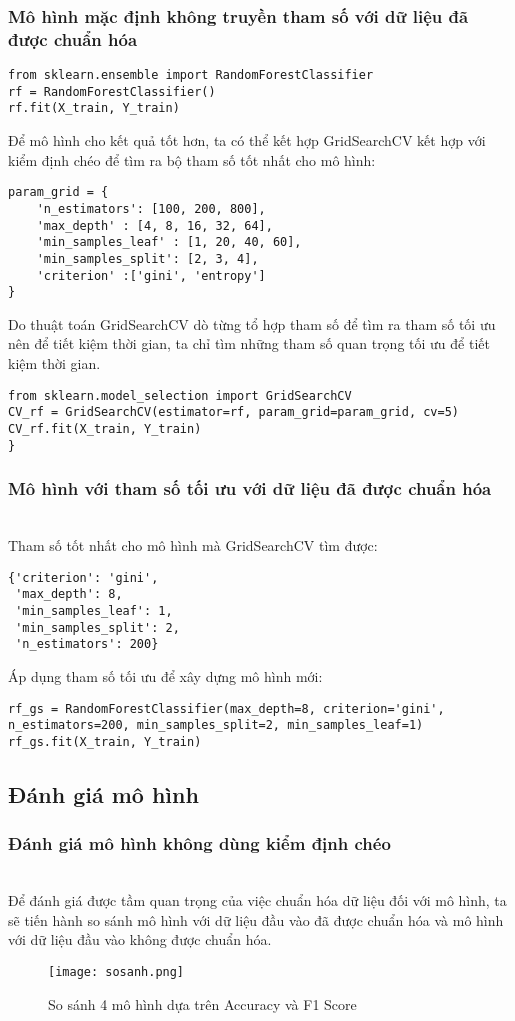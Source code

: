 \documentclass[conference]{IEEEtran}
\begin{document}
\subsubsection{Mô hình mặc định không truyền tham số với dữ liệu đã được chuẩn hóa}
\hfill
\begin{lstlisting}
from sklearn.ensemble import RandomForestClassifier
rf = RandomForestClassifier()
rf.fit(X_train, Y_train)
\end{lstlisting}
Để mô hình cho kết quả tốt hơn, ta có thể kết hợp GridSearchCV kết hợp với kiểm định chéo để tìm ra bộ tham số tốt nhất cho mô hình:
\begin{lstlisting}
param_grid = { 
    'n_estimators': [100, 200, 800],
    'max_depth' : [4, 8, 16, 32, 64],
    'min_samples_leaf' : [1, 20, 40, 60],
    'min_samples_split': [2, 3, 4],
    'criterion' :['gini', 'entropy']
}
\end{lstlisting}
Do thuật toán GridSearchCV dò từng tổ hợp tham số để tìm ra tham số tối ưu nên để tiết kiệm thời gian, ta chỉ tìm những tham số quan trọng tối ưu để tiết kiệm thời gian.
\begin{lstlisting}
from sklearn.model_selection import GridSearchCV
CV_rf = GridSearchCV(estimator=rf, param_grid=param_grid, cv=5)
CV_rf.fit(X_train, Y_train)
}
\end{lstlisting}
\subsubsection{Mô hình với tham số tối ưu với dữ liệu đã được chuẩn hóa}
\hfill\\
Tham số tốt nhất cho mô hình mà GridSearchCV tìm được:
\begin{lstlisting}
{'criterion': 'gini',
 'max_depth': 8,
 'min_samples_leaf': 1,
 'min_samples_split': 2,
 'n_estimators': 200}
\end{lstlisting}
Áp dụng tham số tối ưu để xây dựng mô hình mới:
\begin{lstlisting}
rf_gs = RandomForestClassifier(max_depth=8, criterion='gini', n_estimators=200, min_samples_split=2, min_samples_leaf=1)
rf_gs.fit(X_train, Y_train)
\end{lstlisting}
\subsection{Đánh giá mô hình}
\subsubsection{Đánh giá mô hình không dùng kiểm định chéo}
\hfill\\
Để đánh giá được tầm quan trọng của việc chuẩn hóa dữ liệu đối với mô hình, ta sẽ tiến hành so sánh mô hình với dữ liệu đầu vào đã được chuẩn hóa và mô hình với dữ liệu đầu vào không được chuẩn hóa.
\begin{figure}[htbp]
\centerline{\texttt{[image: sosanh.png]}}
\caption{So sánh 4 mô hình dựa trên Accuracy và F1 Score}
\label{fig}
\end{figure}
\end{document}
